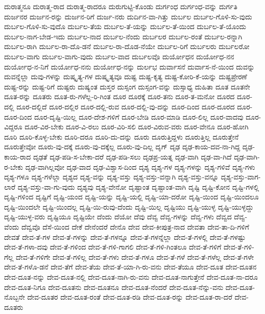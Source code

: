 {ದುರಾತ್ಮನೂ
ದುರಾತ್ಮ-ರಾದ
ದುರಾತ್ಮ-ರಾದರೂ
ದುರುಗುಟ್ಟಿ-ಕೊಂಡು
ದುರ್ಗಂಧ
ದುರ್ಗಂಧ-ವನ್ನು
ದುರ್ಗತಿ
ದುರ್ಜನರ
ದುರ್ಜನ-ರನ್ನು
ದುರ್ಜನ-ರಿಗೆ
ದುರ್ಜ-ನರು
ದುರ್ದಿನ-ವಾ-ಗಿತ್ತು
ದುರ್ಬಲ
ದುರ್ಬಲ-ಗೊಳಿ-ಸು-ವುದು
ದುರ್ಬಲ-ಗೊಳಿ-ಸು-ವುದೊ
ದುರ್ಬಲ-ತೆಯ
ದುರ್ಬಲ-ತೆ-ಯನ್ನು
ದುರ್ಬಲ-ತೆ-ಯಿಂದ
ದುರ್ಬಲ-ತೆ-ಯೊಂದು
ದುರ್ಬಲ-ನಾಗ-ಬೇಡ-ಇದು
ದುರ್ಬಲ-ನಾದ
ದುರ್ಬಲ-ನೆಂದು
ದುರ್ಬಲರ
ದುರ್ಬಲ-ರಂತೆ
ದುರ್ಬಲ-ರನ್ನಾಗಿ
ದುರ್ಬಲ-ರಾಗಿ
ದುರ್ಬಲ-ರಾ-ದೊ-ಡನೆ
ದುರ್ಬಲ-ರಾ-ದೊಡ-ನೆಯೇ
ದುರ್ಬಲ-ರಿಗೆ
ದುರ್ಬಲರು
ದುರ್ಬಲರೋ
ದುರ್ಬಲ-ವಾಗು
ದುರ್ಬಲ-ವಾಗು-ವುದು
ದುರ್ಬಲ-ವಾದ
ದುರ್ಬಲವೊ
ದುರ್ಯೋಧನ
ದುರ್ಯೋಧ-ನನ
ದುರ್ಯೋಧ-ನ-ನಿಗೆ
ದುರ್ಯೋಧ-ನನು
ದುರ್ಯೋಧ-ನನ್ನು
ದುರ್ಲಭ
ದುರ್ವಾಸನೆ
ದುರ್ವಾಸ-ನೆ-ಯಿಂದ
ದುವನ್ನು
ದುವನ್ನೆಲ್ಲಾ
ದುವು-ಗಳನ್ನು
ದುಷ್ಕೃತ್ಯ-ಗಳ
ದುಷ್ಕೃತ್ಯವೂ
ದುಷ್ಟ
ದುಷ್ಟ-ಕೃತ್ಯ
ದುಷ್ಟ-ಕೋರಿ-ಕೆ-ಯನ್ನು
ದುಷ್ಟಪ್ರೇರಣೆ
ದುಷ್ಟ-ರನ್ನು
ದುಷ್ಟ-ರಿಗೆ
ದುಷ್ಟರು
ದುಷ್ಯಂತ
ದುಸ್ತರ
ದುಸ್ಸಂಗ
ದುಸ್ಸಂಗ-ವನ್ನು
ದುಸ್ಸಾಧ್ಯ
ದುಹಿತಾ
ದೂತ
ದೂತನೇ
ದೂತ-ರನ್ನು
ದೂತರು
ದೂತ-ರು-ಗಳೆಲ್ಲ-ರಿ-ಗಿಂತ
ದೂರ
ದೂರಕ್ಕೆ
ದೂರ-ತನು
ದೂರ-ತ-ಮನೋ
ದೂರದ
ದೂರ-ದಲ್ಲಿ
ದೂರ-ದಲ್ಲಿದೆ
ದೂರ-ದಲ್ಲಿರ
ದೂರ-ದಲ್ಲಿ-ರುವ
ದೂರ-ದಲ್ಲಿ-ವು-ದನ್ನು
ದೂರ-ದಿಂದ
ದೂರ-ದೂರದ
ದೂರ-ದೂರ-ದಿಂದ
ದೂರ-ದೃಷ್ಟಿ-ಯಿಲ್ಲ
ದೂರ-ದೇಶ-ಗಳಿಗೆ
ದೂರ-ಬೇಡಿ
ದೂರ-ಮಾಡಿ
ದೂರ-ಲಿಲ್ಲ
ದೂರ-ವಾದವು
ದೂರ-ವಿದ್ದರೂ
ದೂರ-ವಿರ-ಬೇಕು
ದೂರ-ವಿ-ರಲು
ದೂರ-ವಿರಿ-ಸಲಿ
ದೂರ-ವಿರುವ-ವರು
ದೂರ-ವೇನೂ
ದೂರ-ಹೋಗಿ
ದೂರಿ
ದೂರಿ-ಕೊಳ್ಳ-ಬೇಕು
ದೂರಿ-ದರೂ
ದೂರಿ-ದು-ದನ್ನು
ದೂರು
ದೂರುತ್ತಿದ್ದಳು
ದೂರುತ್ತಿಲ್ಲ
ದೂರುತ್ತೇನೆ
ದೂರುತ್ತೇವೋ
ದೂರು-ವು-ದಕ್ಕೆ
ದೂರು-ವು-ದಕ್ಕೆಲ್ಲ
ದೂರು-ವು-ದಿಲ್ಲ
ದೃಗ್
ದೃಢ
ದೃಢ-ಕಾಯ-ದವ-ನಾ-ಗಿದ್ದ
ದೃಢ-ಕಾಯ-ರಾದ
ದೃಢತೆ
ದೃಢ-ಪಡಿ-ಸ-ಬೇಕಾ-ದರೆ
ದೃಢ-ಪಡಿ-ಸಲು
ದೃಢಪ್ರ-ಯತ್ನ
ದೃಢ-ವಾಗಿ
ದೃಢ-ವಾ-ಗಿದೆ
ದೃಢ-ವಾಗಿ-ರ-ಬೇಕು
ದೃಢ-ವಾಗಿಲ್ಲವೋ
ದೃಢ-ವಾದ
ದೃಢ-ವಿಶ್ವಾಸ-ದಿಂದ
ದೃಶ್ಯ
ದೃಶ್ಯ-ಗಳ
ದೃಶ್ಯ-ಗಳನ್ನು
ದೃಶ್ಯ-ಗಳಿವೆ
ದೃಶ್ಯ-ಗಳು
ದೃಶ್ಯ-ಗಳೂ
ದೃಶ್ಯ-ಗಳೆಲ್ಲಾ
ದೃಶ್ಯದ
ದೃಶ್ಯ-ವನ್ನು
ದೃಶ್ಯ-ವಸ್ತು
ದೃಶ್ಯ-ವಸ್ತು-ವನ್ನಾಗಿ
ದೃಶ್ಯ-ವಸ್ತು-ವನ್ನೂ
ದೃಶ್ಯ-ವಸ್ತು-ವಾಗ-ಲಾರೆ
ದೃಶ್ಯ-ವಸ್ತು-ವಾ-ಗು-ವುದು
ದೃಶ್ಯವು
ದೃಶ್ಯ-ವೇನೋ
ದೃಷ್ಟಾಂತ
ದೃಷ್ಟಾಂತ-ವಾಗಿ
ದೃಷ್ಟಿ
ದೃಷ್ಟಿ-ಕೋನ
ದೃಷ್ಟಿ-ಗಳಲ್ಲಿ
ದೃಷ್ಟಿ-ಗಳಿಂದ
ದೃಷ್ಟಿಗೆ
ದೃಷ್ಟಿ-ಯಂದ
ದೃಷ್ಟಿ-ಯನ್ನು
ದೃಷ್ಟಿ-ಯಲ್ಲಿ
ದೃಷ್ಟಿ-ಯಾ-ದರೋ
ದೃಷ್ಟಿ-ಯಿಂದ
ದೃಷ್ಟಿ-ಯಿಂದಲೂ
ದೃಷ್ಟಿ-ಯಿಂದಲೇ
ದೃಷ್ಟಿ-ಯಿಂದಲ್ಲ
ದೃಷ್ಟಿ-ಯಿ-ರುವು-ದೆಂದು
ದೃಷ್ಟಿ-ಯಿಲ್ಲ
ದೃಷ್ಟಿಯು
ದೃಷ್ಟಿ-ಯುಳ್ಳ
ದೃಷ್ಟಿ-ಯುಳ್ಳದ್ದು
ದೃಷ್ಟಿ-ಯುಳ್ಳ-ವರು
ದೃಷ್ಟಿಯೂ
ದೃಷ್ಟಿಯೇ
ದೆಂದು
ದೆಯೋ
ದೆವು
ದೆವ್ವ
ದೆವ್ವ-ಗಳನ್ನು
ದೆವ್ವ-ಗಳು
ದೆವ್ವದ
ದೆವ್ವ-ವೆಂದು
ದೆವ್ವವೊ
ದೆಸೆ-ಯಿಂದ
ದೇಕೆ
ದೇನೆಂದರೆ
ದೇನೊ
ದೇವ
ದೇವ-ಕೀಪುತ್ರ-ನಾದ
ದೇವತಾ
ದೇವ-ತಾ-ದಿ-ಗಳಿಗೆ
ದೇವತೆ
ದೇವ-ತೆ-ಗಳ
ದೇವ-ತೆ-ಗಳನ್ನು
ದೇವ-ತೆ-ಗಳನ್ನೂ
ದೇವ-ತೆ-ಗಳನ್ನೆಲ್ಲಾ
ದೇವ-ತೆ-ಗಳಲ್ಲಿ
ದೇವ-ತೆ-ಗಳಷ್ಟು
ದೇವ-ತೆ-ಗಳಾ-ದವು
ದೇವ-ತೆ-ಗಳಿಂದ
ದೇವ-ತೆ-ಗಳಿ-ಗಾಗಲಿ
ದೇವ-ತೆ-ಗಳಿ-ಗಿಂತಲೂ
ದೇವ-ತೆ-ಗಳಿಗೆ
ದೇವ-ತೆ-ಗಳಿ-ಗೆಲ್ಲ
ದೇವ-ತೆ-ಗಳಿಗೇ
ದೇವ-ತೆ-ಗಳಿಲ್ಲ
ದೇವ-ತೆ-ಗಳು
ದೇವ-ತೆ-ಗಳೂ
ದೇವ-ತೆ-ಗಳೆ
ದೇವ-ತೆ-ಗಳೆಲ್ಲ
ದೇವ-ತೆ-ಗಳೇ
ದೇವ-ತೆ-ಗಳೊ-ಡನೆ
ದೇವ-ತೆಗೆ
ದೇವ-ತೆಯ
ದೇವ-ತೆ-ಯಾ-ಗಿ-ರು-ವನು
ದೇವ-ತೆಯೂ
ದೇವ-ದೂತ
ದೇವ-ದೂತನ
ದೇವ-ದೂತ-ನನ್ನು
ದೇವ-ದೂತ-ನಲ್ಲಿ
ದೇವ-ದೂತ-ನಾಗಿ-ರು-ವನು
ದೇವ-ದೂತ-ನಾಗುತ್ತೇನೆ
ದೇವ-ದೂತ-ನಾ-ದರೂ
ದೇವ-ದೂತ-ನಿಗೂ
ದೇವ-ದೂತನು
ದೇವ-ದೂತನೂ
ದೇವ-ದೂತ-ನೆಂದರೆ
ದೇವ-ದೂತ-ನೆನ್ನು-ವನು
ದೇವ-ದೂತ-ನೊಬ್ಬನೇ
ದೇವ-ದೂತರ
ದೇವ-ದೂತ-ರಂತೆ
ದೇವ-ದೂತ-ರಡಿ
ದೇವ-ದೂತ-ರನ್ನು
ದೇವ-ದೂತ-ರಾ-ದರೆ
ದೇವ-ದೂತರು
}
